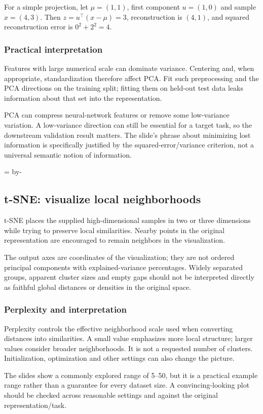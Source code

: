 \documentclass[11pt]{article}
\newcommand{\newsubsection}[1]{\par\begingroup\skip0=\pagegoal\advance\skip0 by-\pagetotal\ifdim\skip0<12\baselineskip\newpage\fi\endgroup\subsection{#1}}
\begin{document}
For a simple projection, let $\mu=(1,1)$, first component $u=(1,0)$ and sample $x=(4,3)$. Then $z=u^\top(x-\mu)=3$, reconstruction is $(4,1)$, and squared reconstruction error is $0^2+2^2=4$.

\subsubsection{Practical interpretation}
Features with large numerical scale can dominate variance. Centering and, when appropriate, standardization therefore affect PCA. Fit such preprocessing and the PCA directions on the training split; fitting them on held-out test data leaks information about that set into the representation.

PCA can compress neural-network features or remove some low-variance variation. A low-variance direction can still be essential for a target task, so the downstream validation result matters. The slide's phrase about minimizing lost information is specifically justified by the squared-error/variance criterion, not a universal semantic notion of information.

\newsubsection{t-SNE: visualize local neighborhoods}
t-SNE places the supplied high-dimensional samples in two or three dimensions while trying to preserve local similarities. Nearby points in the original representation are encouraged to remain neighbors in the visualization.

The output axes are coordinates of the visualization; they are not ordered principal components with explained-variance percentages. Widely separated groups, apparent cluster sizes and empty gaps should not be interpreted directly as faithful global distances or densities in the original space.

\subsubsection{Perplexity and interpretation}
Perplexity controls the effective neighborhood scale used when converting distances into similarities. A small value emphasizes more local structure; larger values consider broader neighborhoods. It is not a requested number of clusters. Initialization, optimization and other settings can also change the picture.

The slides show a commonly explored range of 5--50, but it is a practical example range rather than a guarantee for every dataset size. A convincing-looking plot should be checked across reasonable settings and against the original representation/task.
\end{document}
